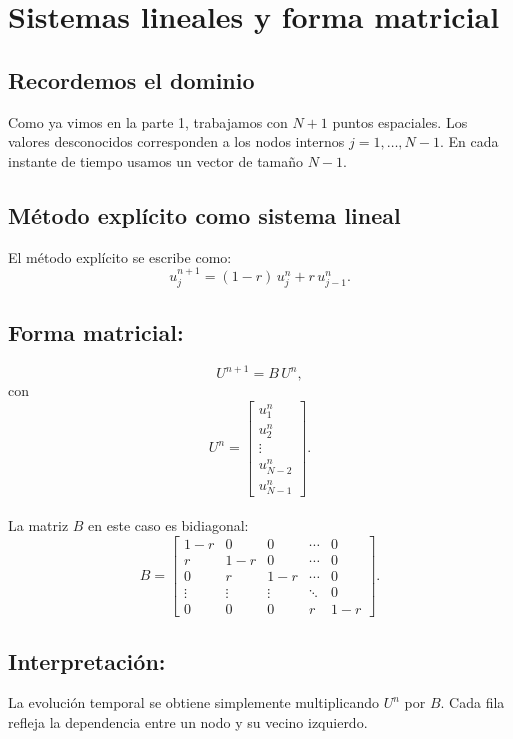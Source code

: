 \documentclass[12pt,a4paper]{article}
\begin{document}
\section{Sistemas lineales y forma matricial}

\subsection{Recordemos el dominio}
Como ya vimos en la parte 1, trabajamos con $N+1$ puntos espaciales.  
Los valores desconocidos corresponden a los nodos internos $j=1,\dots,N-1$. En cada instante de tiempo usamos un vector de tamaño $N-1$.

\subsection{Método explícito como sistema lineal}

El método explícito se escribe como:
\[
u_j^{n+1} = (1-r)\,u_j^n + r\,u_{j-1}^n.
\]

\subsection*{Forma matricial:}
\[
U^{n+1} = B\,U^n,
\]
con
\[
U^n = 
\begin{bmatrix}
u_1^n \\[4pt] u_2^n \\[4pt] \vdots \\[4pt] u_{N-2}^n \\[4pt] u_{N-1}^n
\end{bmatrix}.
\] \\

La matriz $B$ en este caso es bidiagonal:
\[
B = 
\begin{bmatrix}
1-r & 0   & 0   & \cdots & 0 \\[4pt]
r   & 1-r & 0   & \cdots & 0 \\[4pt]
0   & r   & 1-r & \cdots & 0 \\[4pt]
\vdots & \vdots & \vdots & \ddots & 0 \\[4pt]
0   & 0   & 0   & r      & 1-r
\end{bmatrix}.
\]

\subsection*{Interpretación:}
La evolución temporal se obtiene simplemente multiplicando $U^n$ por $B$. Cada fila refleja la dependencia entre un nodo y su vecino izquierdo.
\end{document}
